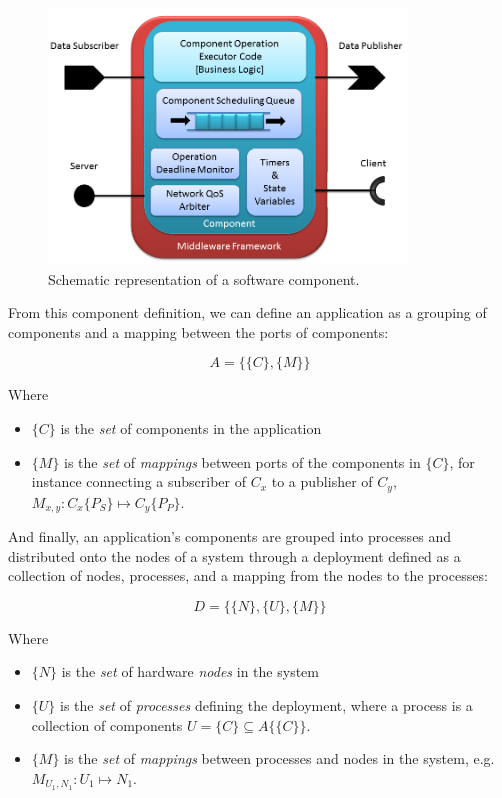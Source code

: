 \begin{figure}[ht!]
  \centering
  \includegraphics[width=0.85\textwidth]{../doc/src/images/results/ros_component.png}
  \caption{Schematic representation of a software component.}
  \label{fig:component}
\end{figure}

From this component definition, we can define an application as a
grouping of components and a mapping between the ports of components:

\begin{equation}
  A = \{\{C\},\{M\}\}
\end{equation}

Where

\begin{itemize}
\item $\{C\}$ is the \emph{set} of components in the application
\item $\{M\}$ is the \emph{set} of \emph{mappings} between ports of
  the components in $\{C\}$, for instance connecting a subscriber of
  $C_x$ to a publisher of $C_y$, $M_{x,y} : C_x\{P_S\}\mapsto
  C_y\{P_P\}$.
\end{itemize}

And finally, an application's components are grouped into processes
and distributed onto the nodes of a system through a deployment
defined as a collection of nodes, processes, and a mapping from the
nodes to the processes:

\begin{equation}
  D = \{\{N\},\{U\},\{M\}\}
\end{equation}

Where

\begin{itemize}
\item $\{N\}$ is the \emph{set} of hardware \emph{nodes} in the system
\item $\{U\}$ is the \emph{set} of \emph{processes} defining the deployment,
  where a process is a collection of components
  $U=\{C\}\subseteq A\{\{C\}\}$.
\item $\{M\}$ is the \emph{set} of \emph{mappings} between processes and nodes
  in the system, e.g. $M_{U_1,N_1} : U_1\mapsto N_1$.
\end{itemize}

